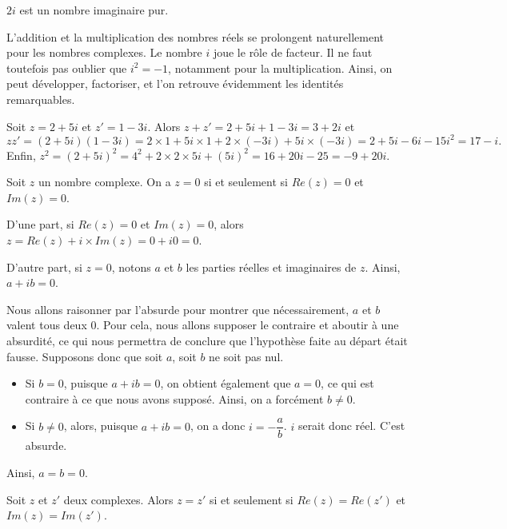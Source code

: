 \documentclass[11pt,fleqn, openany]{book} %
\begin{document}
\begin{example}$2i$ est un nombre imaginaire pur.\end{example}

L'addition et la multiplication des nombres réels se prolongent naturellement pour les nombres complexes. Le nombre $i$ joue le rôle de facteur. Il ne faut toutefois pas oublier que $i^2=-1$, notamment pour la multiplication. Ainsi, on peut développer, factoriser, et l'on retrouve évidemment les identités remarquables.

\begin{example}Soit $z=2+5i$ et $z'=1-3i$. Alors $z +z'=2+5i+1-3i=3+2i$ et
\[zz' = (2+5i)(1-3i)=2 \times 1 + 5i \times 1 + 2 \times (-3i) + 5i \times (-3i)=2+5i-6i -15i^2=17-i.\]
Enfin, $z^2=(2+5i)^2=4^2+2\times 2 \times 5i + (5i)^2 = 16+20i-25=-9+20i$.\end{example}

\begin{proposition}Soit $z$ un nombre complexe. On a $z=0$ si et seulement si $Re(z)=0$ et $Im(z)=0$.\end{proposition}

\begin{demonstration}
D'une part, si $Re(z)=0$ et $Im(z)=0$, alors $z = Re(z) + i \times Im(z) = 0 + i0 = 0$.

D'autre part, si $z=0$, notons $a$ et $b$ les parties réelles et imaginaires de $z$. Ainsi, $a+ib=0$. 

Nous allons raisonner par l'absurde pour montrer que nécessairement, $a$ et $b$ valent tous deux 0. Pour cela, nous allons supposer le contraire et aboutir à une absurdité, ce qui nous permettra de conclure que l'hypothèse faite au départ était fausse. Supposons donc que soit $a$, soit $b$ ne soit pas nul.
\begin{itemize}
\item Si $b=0$, puisque $a+ib=0$, on obtient également que $a=0$, ce qui est contraire à ce que nous avons supposé. Ainsi, on a forcément $b \neq 0$.
\item Si $b\neq 0$, alors, puisque $a+ib=0$, on a donc $i=-\dfrac{a}{b}$. $i$ serait donc réel. C'est absurde.\end{itemize}

Ainsi, $a=b=0$.\end{demonstration}

\begin{proposition}Soit $z$ et $z'$ deux complexes. Alors $z = z'$ si et seulement si $Re(z)=Re(z')$  et $Im(z)=Im(z')$.\end{proposition}
\end{document}
